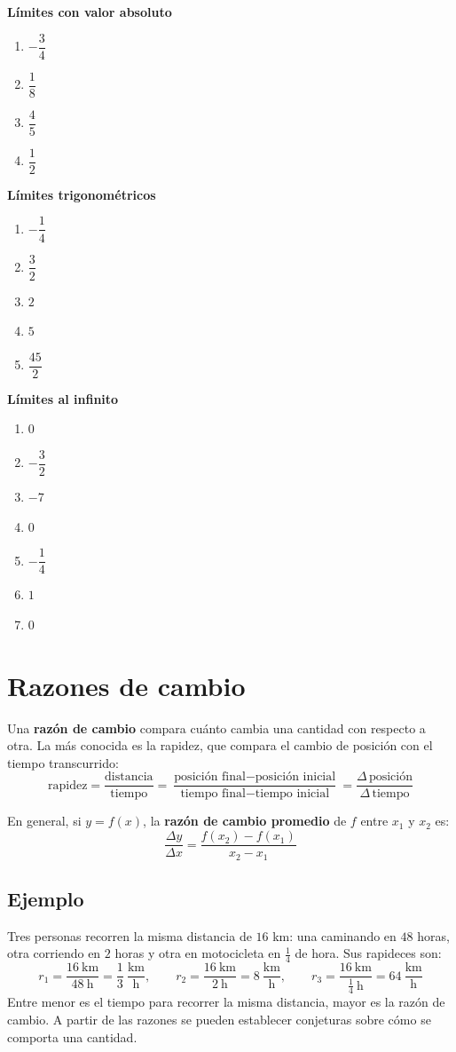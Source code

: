 \documentclass[12pt]{article}
\begin{document}
\textbf{Límites con valor absoluto}
\begin{enumerate}
    \item $-\dfrac{3}{4}$
    \item $\dfrac{1}{8}$
    \item $\dfrac{4}{5}$
    \item $\dfrac{1}{2}$
\end{enumerate}

\textbf{Límites trigonométricos}
\begin{enumerate}
    \item $-\dfrac{1}{4}$
    \item $\dfrac{3}{2}$
    \item $2$
    \item $5$
    \item $\dfrac{45}{2}$
\end{enumerate}

\textbf{Límites al infinito}
\begin{enumerate}
    \item $0$
    \item $-\dfrac{3}{2}$
    \item $-7$
    \item $0$
    \item $-\dfrac{1}{4}$
    \item $1$
    \item $0$
\end{enumerate}

\section{Razones de cambio}

Una \textbf{razón de cambio} compara cuánto cambia una cantidad con respecto a otra. La más conocida es la rapidez, que compara el cambio de posición con el tiempo transcurrido:
\[
\text{rapidez} = \frac{\text{distancia}}{\text{tiempo}} = \frac{\text{posición final} - \text{posición inicial}}{\text{tiempo final} - \text{tiempo inicial}} = \frac{\Delta\, \text{posición}}{\Delta\, \text{tiempo}}
\]

En general, si $y = f(x)$, la \textbf{razón de cambio promedio} de $f$ entre $x_1$ y $x_2$ es:
\[
\frac{\Delta y}{\Delta x} = \frac{f(x_2) - f(x_1)}{x_2 - x_1}
\]

\subsection{Ejemplo}
Tres personas recorren la misma distancia de $16$ km: una caminando en $48$ horas, otra corriendo en $2$ horas y otra en motocicleta en $\frac{1}{4}$ de hora. Sus rapideces son:
\[
r_1 = \frac{16\ \text{km}}{48\ \text{h}} = \frac{1}{3}\ \frac{\text{km}}{\text{h}}, \qquad
r_2 = \frac{16\ \text{km}}{2\ \text{h}} = 8\ \frac{\text{km}}{\text{h}}, \qquad
r_3 = \frac{16\ \text{km}}{\frac{1}{4}\ \text{h}} = 64\ \frac{\text{km}}{\text{h}}
\]
Entre menor es el tiempo para recorrer la misma distancia, mayor es la razón de cambio. A partir de las razones se pueden establecer conjeturas sobre cómo se comporta una cantidad.
\end{document}
